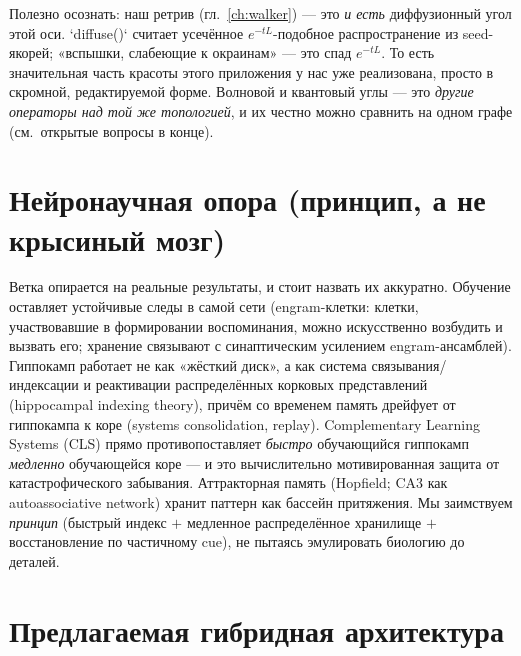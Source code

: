 \begin{intuition}
Полезно осознать: наш ретрив (гл.~\ref{ch:walker}) — это \emph{и есть} диффузионный угол
этой оси. `diffuse()` считает усечённое $e^{-tL}$-подобное распространение из seed-якорей;
«вспышки, слабеющие к окраинам» — это спад $e^{-tL}$. То есть значительная часть красоты
этого приложения у нас уже реализована, просто в скромной, редактируемой форме. Волновой и
квантовый углы — это \emph{другие операторы над той же топологией}, и их честно можно
сравнить на одном графе (см.\ открытые вопросы в конце).
\end{intuition}

\section{Нейронаучная опора (принцип, а не крысиный мозг)}

Ветка опирается на реальные результаты, и стоит назвать их аккуратно. Обучение оставляет
устойчивые следы в самой сети (engram-клетки: клетки, участвовавшие в формировании
воспоминания, можно искусственно возбудить и вызвать его; хранение связывают с синаптическим
усилением engram-ансамблей). Гиппокамп работает не как «жёсткий диск», а как система
связывания/индексации и реактивации распределённых корковых представлений (hippocampal
indexing theory), причём со временем память дрейфует от гиппокампа к коре (systems
consolidation, replay). Complementary Learning Systems (CLS) прямо противопоставляет
\emph{быстро} обучающийся гиппокамп \emph{медленно} обучающейся коре — и это вычислительно
мотивированная защита от катастрофического забывания. Аттракторная память (Hopfield; CA3 как
autoassociative network) хранит паттерн как бассейн притяжения. Мы заимствуем \emph{принцип}
(быстрый индекс $+$ медленное распределённое хранилище $+$ восстановление по частичному cue),
не пытаясь эмулировать биологию до деталей.

\section{Предлагаемая гибридная архитектура}

